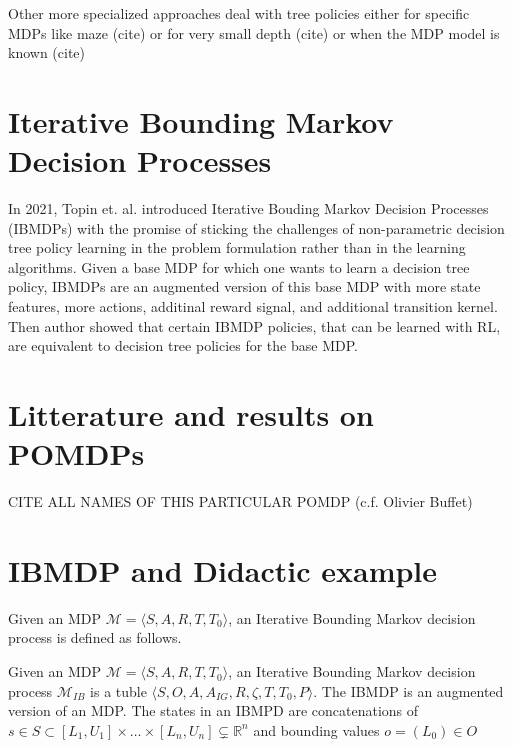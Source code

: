 Other more specialized approaches deal with tree policies either for specific MDPs like maze (cite) or for very small depth (cite) or when the MDP model is known (cite)
\section{Iterative Bounding Markov Decision Processes}
In 2021, Topin et. al. introduced Iterative Bouding Markov Decision Processes (IBMDPs) with the promise of sticking the challenges of non-parametric decision tree policy learning in the problem formulation rather than in the learning algorithms.
Given a base MDP for which one wants to learn a decision tree policy, IBMDPs are an augmented version of this base MDP with more state features, more actions, additinal reward signal, and additional transition kernel.
Then author showed that certain IBMDP policies, that can be learned with RL, are equivalent to decision tree policies for the base MDP. 
\section{Litterature and results on POMDPs}
CITE ALL NAMES OF THIS PARTICULAR POMDP (c.f. Olivier Buffet)

\section{IBMDP and Didactic example}
Given an MDP $\mathcal{M}= \langle S, A, R, T, T_0 \rangle$, an Iterative Bounding Markov decision process is defined as follows.
\begin{definition}
    Given an MDP $\mathcal{M}= \langle S, A, R, T, T_0 \rangle$, an Iterative Bounding Markov decision process $\mathcal{M}_{IB}$ is a tuble $\langle S, O, A, A_{IG}, R, \zeta, T, T_0, P\rangle$.
    The IBMDP is an augmented version of an MDP. The states in an IBMPD are concatenations of $s\in S \subset [L_1, U_1]\times\dots \times [L_n, U_n] \subsetneq \mathbb{R}^n$ and bounding values $o = (L_0) \in O$ 
\end{definition}

